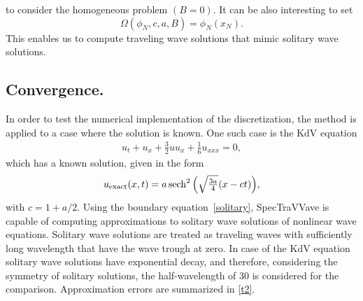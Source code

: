 	 to consider the homogeneous problem $(B=0)$.
	It can be also interesting to set
\begin{equation}
	\Omega(\phi_N, c, a, B) = \phi_N(x_N). \label{solitary}
\end{equation}
	 This enables us to compute traveling wave solutions that mimic solitary wave solutions. 	


\subsection{Convergence.}
In order to test the numerical implementation of the discretization,
the method is applied to a case where the solution is known.
One such case is the KdV equation
\begin{align*}
u_t + u_x + \frac{3}{2} u u_x + \frac{1}{6}u_{xxx} = 0, 
\end{align*}
which has a known solution, given in the form
\begin{align*}
u_{\mathrm{exact}}(x,t) = a \operatorname{sech}^2\Big( {\textstyle\sqrt{\frac{3a}{4}}} (x-c t)\Big),\\
\end{align*}
with $c=1+a/2$.
%
Using the boundary equation~\eqref{solitary}, \textsf{SpecTraVVave} is capable of computing 
approximations to solitary wave solutions of nonlinear wave equations. 
Solitary wave solutions are treated as traveling waves with sufficiently long wavelength 
that have the wave trough at zero.
In case of the KdV equation solitary wave solutions have exponential decay, 
and therefore, considering the symmetry of solitary solutions, 
the half-wavelength of $30$ is considered for the comparison. 
Approximation errors are summarized in \ref{t2}.
%

